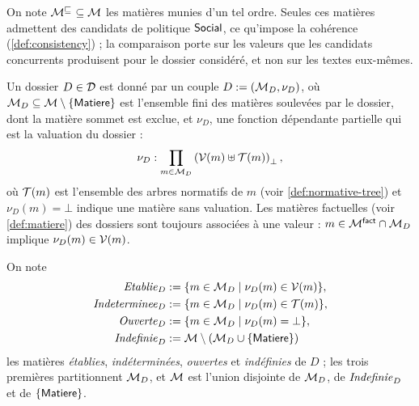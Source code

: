 \documentclass[review]{jflart}
\begin{document}
On note \(\mathcal{M}^{\mathrel{\sqsubseteq_{}}}\subseteq\mathcal{M}\) les matières munies d'un tel ordre.
Seules ces matières admettent des candidats de politique \(\mathsf{Social}\), ce
qu'impose la cohérence (\autoref{def:consistency}) ; la comparaison porte
sur les valeurs que les candidats concurrents produisent pour le dossier
considéré, et non sur les textes eux-mêmes.

\begin{defi}[Dossier]\label{def:dossier}
Un dossier \(D\in\mathcal{D}\) est donné par un couple
\(D:=(\mathcal{M}_D,\nu_D)\), où \(\mathcal{M}_D\subseteq\mathcal{M}\setminus\{\mathsf{Matiere}\}\)
est l'ensemble fini des matières soulevées par le dossier, dont la matière
sommet est exclue, et \(\nu_D\), une fonction dépendante partielle qui est la valuation du dossier :
\[
\nu_D:\prod_{m\in\mathcal{M}_D}\left(\mathcal{V}(m)\uplus\mathcal{T}(m)\right)_\bot,
\]
où \(\mathcal{T}(m)\) est l'ensemble des arbres normatifs de \(m\)
(voir \autoref{def:normative-tree}) et $\nu_D(m)=\bot$ indique une matière sans valuation. Les matières factuelles (voir \autoref{def:matiere}) des dossiers sont toujours associées à une valeur : $m\in\mathcal{M}^{\mathsf{fact}}\cap\mathcal{M}_D$ implique $\nu_D(m)\in\mathcal{V}(m)$.

\end{defi}

On note
\[
\begin{aligned}
\mathit{Etablie}_D&:=\{m\in\mathcal M_D\mid \nu_D(m)\in\mathcal{V}(m)\},\\
\mathit{Indeterminee}_D&:=\{m\in\mathcal M_D\mid \nu_D(m)\in\mathcal{T}(m)\},\\
\mathit{Ouverte}_D&:=\{m\in\mathcal M_D\mid \nu_D(m) = \bot\},\\
\mathit{Indefinie}_D&:= \mathcal{M}\setminus(\mathcal{M}_D\cup\{\mathsf{Matiere}\})
\end{aligned}
\]
les matières \emph{établies}, \emph{indéterminées}, \emph{ouvertes} et
\emph{indéfinies} de \(D\) ; les trois premières partitionnent \(\mathcal{M}_D\), et
\(\mathcal{M}\) est l'union disjointe de \(\mathcal{M}_D\), de \(\mathit{Indefinie}_D\) et de
\(\{\mathsf{Matiere}\}\).
\end{document}
